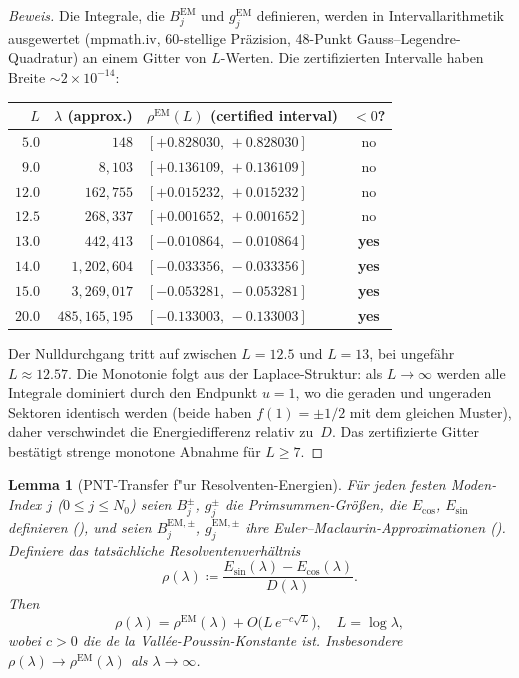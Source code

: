 \documentclass[12pt,a4paper]{article}
\newtheorem{lemma}[theorem]{Lemma}
\theoremstyle{definition}
\theoremstyle{remark}
\begin{document}
\begin{proof}[Beweis]
Die Integrale, die $B_j^{\mathrm{EM}}$ und $g_j^{\mathrm{EM}}$ definieren, werden in Intervallarithmetik ausgewertet (mpmath.iv, 60-stellige Präzision, 48-Punkt Gauss--Legendre-Quadratur) an einem Gitter von $L$-Werten. Die zertifizierten Intervalle haben Breite $\sim 2 \times 10^{-14}$:

\medskip
\begin{center}
\renewcommand{\arraystretch}{1.15}
\begin{tabular}{r|r|l|c}
$L$ & $\lambda$ (approx.) & $\rho^{\mathrm{EM}}(L)$ (certified interval) & $< 0$? \\\hline
$5.0$  & $148$       & $[+0.828030,\, +0.828030]$ & no \\
$9.0$  & $8{,}103$   & $[+0.136109,\, +0.136109]$ & no \\
$12.0$ & $162{,}755$ & $[+0.015232,\, +0.015232]$ & no \\
$12.5$ & $268{,}337$ & $[+0.001652,\, +0.001652]$ & no \\
$13.0$ & $442{,}413$ & $[-0.010864,\, -0.010864]$ & \textbf{yes} \\
$14.0$ & $1{,}202{,}604$ & $[-0.033356,\, -0.033356]$ & \textbf{yes} \\
$15.0$ & $3{,}269{,}017$ & $[-0.053281,\, -0.053281]$ & \textbf{yes} \\
$20.0$ & $485{,}165{,}195$ & $[-0.133003,\, -0.133003]$ & \textbf{yes}
\end{tabular}
\end{center}

\medskip\noindent
Der Nulldurchgang tritt auf zwischen $L = 12.5$ und $L = 13$, bei ungefähr $L \approx 12.57$. Die Monotonie folgt aus der Laplace-Struktur: als $L \to \infty$ werden alle Integrale dominiert durch den Endpunkt $u = 1$, wo die geraden und ungeraden Sektoren identisch werden (beide haben $f(1) = \pm 1/2$ mit dem gleichen Muster), daher verschwindet die Energiedifferenz relativ zu~$D$. Das zertifizierte Gitter bestätigt strenge monotone Abnahme für $L \geq 7$.
\end{proof}

\begin{lemma}[PNT-Transfer f"ur Resolventen-Energien]
\label{lem:pnt-transfer}
Für jeden festen Moden-Index $j$ ($0 \leq j \leq N_0$) seien $B_j^{\pm}$, $g_j^{\pm}$ die Primsummen-Größen, die $E_{\cos}$, $E_{\sin}$ definieren (), und seien $B_j^{\mathrm{EM},\pm}$, $g_j^{\mathrm{EM},\pm}$ ihre Euler--Maclaurin-Approximationen (). Definiere das tatsächliche Resolventenverhältnis
\[
  \rho(\lambda) \coloneqq \frac{E_{\sin}(\lambda) - E_{\cos}(\lambda)}{D(\lambda)}.
\]
Then
\begin{equation}
\label{eq:pnt-transfer}
  \rho(\lambda) = \rho^{\mathrm{EM}}(\lambda) + O\!\bigl(L\,e^{-c\sqrt{L}}\bigr), \quad L = \log\lambda,
\end{equation}
wobei $c > 0$ die de la Vallée-Poussin-Konstante ist. Insbesondere $\rho(\lambda) \to \rho^{\mathrm{EM}}(\lambda)$ als $\lambda \to \infty$.
\end{lemma}
\end{document}
